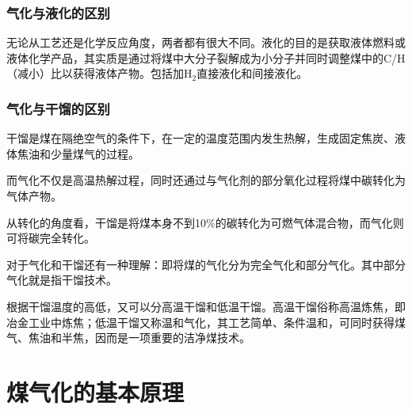 \documentclass[10pt,openany]{ctexbook}
\begin{document}
 \subsubsection{气化与液化的区别}
 无论从工艺还是化学反应角度，两者都有很大不同。液化的目的是获取液体燃料或液体化学产品，其实质是通过将煤中大分子裂解成为小分子并同时调整煤中的C/H（减小）比以获得液体产物。包括加H$_2$直接液化和间接液化。
  \subsubsection{气化与干馏的区别}
干馏是煤在隔绝空气的条件下，在一定的温度范围内发生热解，生成固定焦炭、液体焦油和少量煤气的过程。\par
  而气化不仅是高温热解过程，同时还通过与气化剂的部分氧化过程将煤中碳转化为气体产物。\par
  从转化的角度看，干馏是将煤本身不到10\%的碳转化为可燃气体混合物，而气化则可将碳完全转化。\par
  对于气化和干馏还有一种理解：即将煤的气化分为完全气化和部分气化。其中部分气化就是指干馏技术。\par
  根据干馏温度的高低，又可以分高温干馏和低温干馏。高温干馏俗称高温炼焦，即冶金工业中炼焦；低温干馏又称温和气化，其工艺简单、条件温和，可同时获得煤气、焦油和半焦，因而是一项重要的洁净煤技术。
  \section{煤气化的基本原理}
\end{document}
